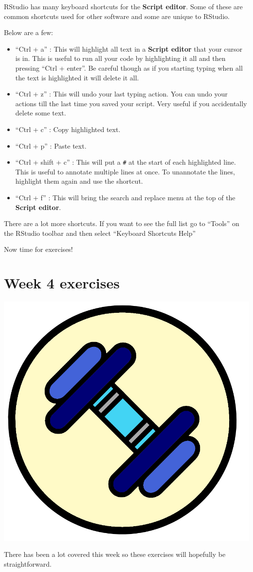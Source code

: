 \documentclass[]{book}
\providecommand{\tightlist}{%
  \setlength{\itemsep}{0pt}\setlength{\parskip}{0pt}}
\begin{document}
RStudio has many keyboard shortcuts for the \textbf{Script editor}. Some
of these are common shortcuts used for other software and some are
unique to RStudio.

Below are a few:

\begin{itemize}
\tightlist
\item
  ``Ctrl + a'' : This will highlight all text in a \textbf{Script
  editor} that your cursor is in. This is useful to run all your code by
  highlighting it all and then pressing ``Ctrl + enter''. Be careful
  though as if you starting typing when all the text is highlighted it
  will delete it all.
\item
  ``Ctrl + z'' : This will undo your last typing action. You can undo
  your actions till the last time you saved your script. Very useful if
  you accidentally delete some text.
\item
  ``Ctrl + c'' : Copy highlighted text.
\item
  ``Ctrl + p'' : Paste text.
\item
  ``Ctrl + shift + c'' : This will put a \texttt{\#} at the start of
  each highlighted line. This is useful to annotate multiple lines at
  once. To unannotate the lines, highlight them again and use the
  shortcut.
\item
  ``Ctrl + f'' : This will bring the search and replace menu at the top
  of the \textbf{Script editor}.
\end{itemize}

There are a lot more shortcuts. If you want to see the full list go to
``Tools'' on the RStudio toolbar and then select ``Keyboard Shortcuts
Help''

Now time for exercises!

\chapter{Week 4 exercises}\label{week-4-exercises}

\begin{center}\includegraphics[width=0.2\linewidth]{figures/exercises} \end{center}

There has been a lot covered this week so these exercises will hopefully
be straightforward.
\end{document}
